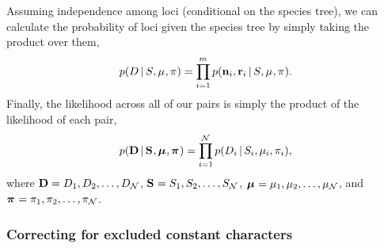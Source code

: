 \begin{linenomath}
Assuming independence among loci (conditional on the species tree), we can
calculate the probability of \nloci{} loci given the species tree by
simply taking the product over them,
\begin{equation}
    \pr(\comparisondata \given \sptree, \murate, \gfreq)
    =
    \prod_{i=1}^{\nloci}
    \pr(\leafallelecounts[i], \leafredallelecounts[i] \given \sptree, \murate, \gfreq).
    \label{eq:comparisonlikelihood}
\end{equation}
Finally, the likelihood across all of our \ncomparisons{} pairs is simply the
product of the likelihood of each pair,
\begin{equation}
    \pr(
    \alldata
    \given
    \sptrees,
    \murates,
    \gfreqs)
    =
    \prod_{i=1}^{\ncomparisons}
    \pr(\comparisondata[i] \given \sptree[i], \murate[i], \gfreq[i]),
    \label{eq:collectionlikelihood}
\end{equation}
where
$\alldata = \comparisondata[1], \comparisondata[2], \ldots, \comparisondata[\ncomparisons]$,
$\sptrees = \sptree[1], \sptree[2], \ldots, \sptree[\ncomparisons]$,
$\murates = \murate[1], \murate[2], \ldots, \murate[\ncomparisons]$,
and
$\gfreqs = \gfreq[1], \gfreq[2], \ldots, \gfreq[\ncomparisons]$.
\end{linenomath}

\subsubsection{Correcting for excluded constant characters}

